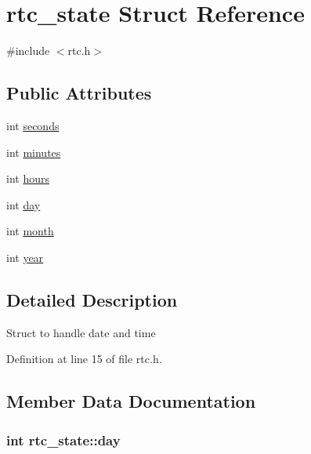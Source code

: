 \hypertarget{structrtc__state}{}\section{rtc\+\_\+state Struct Reference}
\label{structrtc__state}


{\ttfamily \#include $<$rtc.\+h$>$}

\subsection*{Public Attributes}
\begin{DoxyCompactItemize}
\item 
int \hyperlink{structrtc__state_a429a4929b1a83c2960e6d02a16797c92}{seconds}
\item 
int \hyperlink{structrtc__state_a50140b905b14f13910e0338c2089e27d}{minutes}
\item 
int \hyperlink{structrtc__state_ac27e4d929d9cd2f5fcbc91a4312d9dfb}{hours}
\item 
int \hyperlink{structrtc__state_aab92f65ce82f17796deb745ad41c0af1}{day}
\item 
int \hyperlink{structrtc__state_aa9466434d16fd3a921c8e8cf852724fd}{month}
\item 
int \hyperlink{structrtc__state_a7b86720de6b1d03a768409a4f13b96c4}{year}
\end{DoxyCompactItemize}


\subsection{Detailed Description}
Struct to handle date and time 

Definition at line 15 of file rtc.\+h.



\subsection{Member Data Documentation}
\hypertarget{structrtc__state_aab92f65ce82f17796deb745ad41c0af1}{}
\subsubsection[{day}]{\setlength{\rightskip}{0pt plus 5cm}int rtc\+\_\+state\+::day}\label{structrtc__state_aab92f65ce82f17796deb745ad41c0af1}


